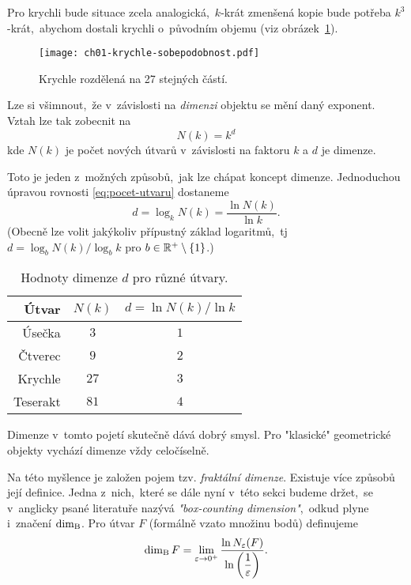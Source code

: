 Pro krychli bude situace zcela analogická,~$k$-krát zmenšená kopie bude potřeba $k^3$-krát,~abychom dostali krychli o~původním objemu (viz obrázek~\ref{fig:krychle-sobepodobnost}).
\begin{figure}[h]
    \centering
    \texttt{[image: ch01-krychle-sobepodobnost.pdf]}
    \caption{Krychle rozdělená na 27 stejných částí.}
    \label{fig:krychle-sobepodobnost}
\end{figure}
Lze si všimnout,~že v~závislosti na \emph{dimenzi} objektu se mění daný exponent. Vztah lze tak zobecnit na
\begin{equation}\label{eq:pocet-utvaru}
    N(k)=k^d
\end{equation}
kde $N(k)$ je počet nových útvarů v~závislosti na faktoru $k$ a $d$ je dimenze.\par
Toto je jeden z~možných způsobů,~jak lze chápat koncept dimenze. Jednoduchou úpravou rovnosti \eqref{eq:pocet-utvaru} dostaneme
\[d=\log_k{N(k)}=\dfrac{\ln{N(k)}}{\ln{k}}.\]
(Obecně lze volit jakýkoliv přípustný základ logaritmů,~tj $d=\log_b{N(k)}/\log_b{k}$ pro $b\in\mathbb{R}^+\setminus\left\{1\right\}$.)
\begin{table}[h]
    \centering
    \begin{tabular}{r|cc}
    Útvar    & $N(k)$ & $d=\ln{N(k)}/\ln{k}$ \\ \hline
    Úsečka   & $3$      & $1$                          \\
    Čtverec  & $9$      & $2$                          \\
    Krychle  & $27$     & $3$                          \\
    Teserakt & $81$     & $4$                          \\
    \end{tabular}
    \caption{Hodnoty dimenze $d$ pro různé útvary.}
    \label{table:eukleides-dimenze}
\end{table}
Dimenze v~tomto pojetí skutečně dává dobrý smysl. Pro "klasické" geometrické objekty vychází dimenze vždy celočíselně.\par
Na této myšlence je založen pojem tzv. \emph{fraktální dimenze}. Existuje více způsobů její definice. Jedna z~nich,~které se dále nyní v~této sekci budeme držet,~se v~anglicky psané literatuře nazývá \emph{"box-counting dimension"},~odkud plyne i~značení $\operatorname{dim_B}$. Pro útvar $F$ (formálně vzato množinu bodů) definujeme 
\begin{equation}\label{eq:fraktalni-dimenze}
    \operatorname{dim_B}{F}=\lim_{\varepsilon\to 0^+}{\dfrac{\ln{N_\varepsilon(F)}}{\ln{\left(\dfrac{1}{\varepsilon}\right)}}}.
\end{equation}
